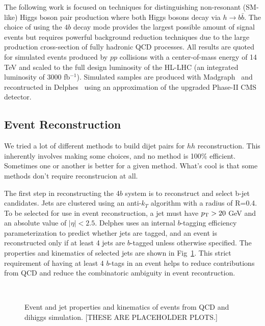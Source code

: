 The following work is focused on techniques for distinguishing non-resonant (SM-like) Higgs boson pair production where both Higgs bosons decay via $h \to b \bar{b}$. The choice of using the $4b$ decay mode provides the largest possible amount of signal events but requires powerful background reduction techniques due to the large production cross-section of fully hadronic QCD processes. All results are quoted for simulated events produced by $pp$ collisions with a center-of-mass energy of 14 TeV and scaled to the full design luminosity of the HL-LHC (an integrated luminosity of 3000 fb$^{-1}$). Simulated samples are produced with Madgraph~\cite{Alwall:2014hca} and recontructed in Delphes~\cite{de_Favereau_2014} using an approximation of the upgraded Phase-II CMS detector.

\subsection{Event Reconstruction}
We tried a lot of different methods to build dijet pairs for $hh$ reconstruction. This inherently involves making some choices, and no method is 100\% efficient. Sometimes one or another is better for a given method. What's cool is that some methods don't require reconstrucion at all.

The first step in reconstructing the 4$b$ system is to reconstruct and select b-jet candidates. Jets are clustered using an anti-$k_T$ algorithm with a radius of R=0.4. To be selected for use in event reconstruction, a jet must have $p_{\text{T}} > 20$ GeV and an absolute value of $\mid\eta\mid < 2.5$. Delphes uses an internal $b$-tagging efficiency parameterization to predict whether jets are tagged, and an event is reconstructed only if at least 4 jets are $b$-tagged unless otherwise specified. The properties and kinematics of selected jets are shown in Fig~\ref{fig:jetInfo}. This strict requirement of having at least 4 $b$-tags in an event helps to reduce contributions from QCD and reduce the combinatoric ambiguity in event recontruction.

\begin{figure}[ht!]
  \begin{center}
  \\
  \caption{Event and jet properties and kinematics of events from QCD and dihiggs simulation. [THESE ARE PLACEHOLDER PLOTS.]}
  \label{fig:jetInfo}
  \end{center}
\end{figure}

